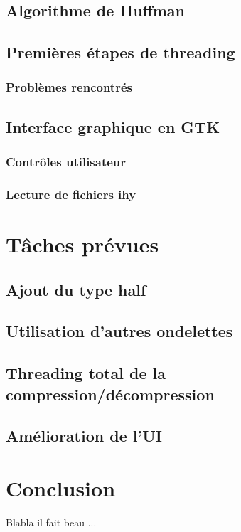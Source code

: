 \documentclass[a4paper,12pt]{article}
\begin{document}
	\subsection{Algorithme de Huffman}

	\subsection{Premières étapes de threading}

		\subsubsection{Problèmes rencontrés}

	\subsection{Interface graphique en GTK}

		\subsubsection{Contrôles utilisateur}

		\subsubsection{Lecture de fichiers ihy}

\section{Tâches prévues}

	\subsection{Ajout du type half}

	\subsection{Utilisation d'autres ondelettes}

	\subsection{Threading total de la compression/décompression}

	\subsection{Amélioration de l'UI}

\newpage

\section*{Conclusion}
Blabla il fait beau ...
\end{document}
